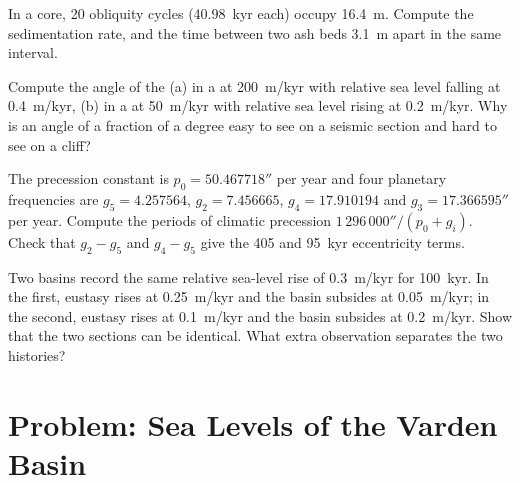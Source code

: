 \begin{exercise}[$\star\star$]\label{exo:b3:sequence-stratigraphy:9}
In a core, 20 obliquity cycles (\qty{40.98}{kyr} each) occupy
\qty{16.4}{m}. Compute the sedimentation rate, and the time between two ash
beds \qty{3.1}{m} apart in the same interval.
\end{exercise}

\begin{exercise}[$\star\star\star$]\label{exo:b3:sequence-stratigraphy:10}
Compute the angle of the  (a) in a  at
\qty{200}{m/kyr} with relative sea level falling at \qty{0.4}{m/kyr}, (b) in
a  at \qty{50}{m/kyr} with relative sea level rising at
\qty{0.2}{m/kyr}. Why is an angle of a fraction of a degree easy to see on a
seismic section and hard to see on a cliff?
\end{exercise}

\begin{exercise}[$\star\star\star$]\label{exo:b3:sequence-stratigraphy:11}
The precession constant is $p_0 = 50.467718''$ per year and four planetary
frequencies are $g_5 = 4.257564$, $g_2 = 7.456665$, $g_4 = 17.910194$ and
$g_3 = 17.366595''$ per year. Compute the periods of climatic precession
$1\,296\,000''/(p_0 + g_i)$. Check that $g_2 - g_5$ and $g_4 - g_5$ give the
405 and \qty{95}{kyr} eccentricity terms.
\end{exercise}

\begin{exercise}[$\star\star\star$]\label{exo:b3:sequence-stratigraphy:12}
Two basins record the same relative sea-level rise of \qty{0.3}{m/kyr} for
\qty{100}{kyr}. In the first, eustasy rises at \qty{0.25}{m/kyr} and the
basin subsides at \qty{0.05}{m/kyr}; in the second, eustasy rises at
\qty{0.1}{m/kyr} and the basin subsides at \qty{0.2}{m/kyr}. Show that the
two sections can be identical. What extra observation separates the two
histories?
\end{exercise}

\section{Problem: Sea Levels of the Varden Basin}

